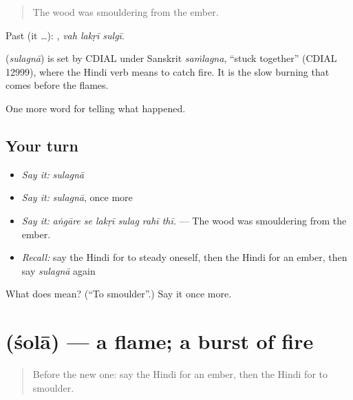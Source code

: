 \begin{quote}
The wood was smouldering from the ember.
\end{quote}

Past (it …):   , \emph{vah lakṛī sulgī}.

\begin{cousinweb}
\textbf{} (\emph{sulagnā}) is set by CDIAL under Sanskrit \emph{saṁlagna}, \textquotedblleft{}stuck together\textquotedblright{} (CDIAL 12999), where the Hindi verb means to catch fire. It is the slow burning that comes before the flames.
\end{cousinweb}

\begin{grammarlens}[title={What you've built}]
One more word for telling what happened.
\end{grammarlens}

\subsection*{Your turn}
\begin{itemize}
\raggedright
  \item \emph{Say it:} \emph{sulagnā}
  \item \emph{Say it:} \emph{sulagnā}, once more
  \item \emph{Say it:} \emph{aṅgāre se lakṛī sulag rahī thī.} — The wood was smouldering from the ember.
  \item \emph{Recall:} say the Hindi for to steady oneself, then the Hindi for an ember, then say \emph{sulagnā} again
\end{itemize}

\begin{tcolorbox}[breakable,colback=teal!4,colframe=teal!35!black,title={Before you move on}]
What does  mean? (\textquotedblleft{}To smoulder\textquotedblright{}.) Say it once more.
\end{tcolorbox}
\section[\texorpdfstring{\hi{शोला} (śolā)}{शोला (śolā)}]{ (śolā) — a flame; a burst of fire}

\label{lesson:HI-C299-sola}



\begin{quote}
Before the new one: say the Hindi for an ember, then the Hindi for to smoulder.
\end{quote}

